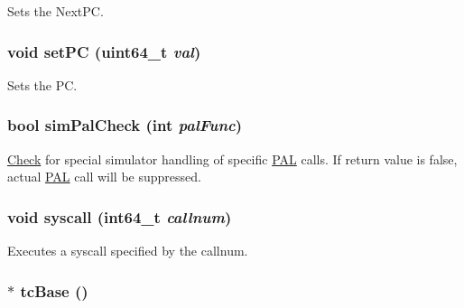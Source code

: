 \label{classExecContext_ac01bbbec5b2a7338e18d05322ba78cd3}
Sets the NextPC. \hypertarget{classExecContext_a27cf930ee8c23222a063cdc302aa0efb}{
\subsubsection[{setPC}]{\setlength{\rightskip}{0pt plus 5cm}void setPC (uint64\_\-t {\em val})}}
\label{classExecContext_a27cf930ee8c23222a063cdc302aa0efb}
Sets the PC. \hypertarget{classExecContext_a461205960be9d52e9beda48a77e9c600}{
\subsubsection[{simPalCheck}]{\setlength{\rightskip}{0pt plus 5cm}bool simPalCheck (int {\em palFunc})}}
\label{classExecContext_a461205960be9d52e9beda48a77e9c600}
\hyperlink{classCheck}{Check} for special simulator handling of specific \hyperlink{structPAL}{PAL} calls. If return value is false, actual \hyperlink{structPAL}{PAL} call will be suppressed. \hypertarget{classExecContext_a36e0b96120fcbbc2ee8699158f7be5c2}{
\subsubsection[{syscall}]{\setlength{\rightskip}{0pt plus 5cm}void syscall (int64\_\-t {\em callnum})}}
\label{classExecContext_a36e0b96120fcbbc2ee8699158f7be5c2}
Executes a syscall specified by the callnum. \hypertarget{classExecContext_ad33756f3e96ee445dca8d69b1dd8709c}{
\subsubsection[{tcBase}]{$\ast$ tcBase ()}}
\label{classExecContext_ad33756f3e96ee445dca8d69b1dd8709c}
